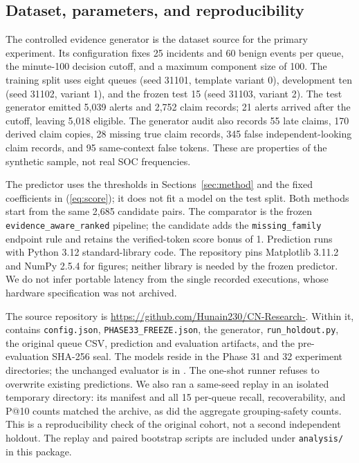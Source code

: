 \documentclass[pdflatex,sn-mathphys-num,iicol]{sn-jnl}
\begin{document}
\subsection{Dataset, parameters, and reproducibility}\label{sec:reproduce}
The controlled evidence generator is the dataset source for the primary experiment. Its configuration fixes 25 incidents and 60 benign events per queue, the minute-100 decision cutoff, and a maximum component size of 100. The training split uses eight queues (seed 31101, template variant 0), development ten (seed 31102, variant 1), and the frozen test 15 (seed 31103, variant 2). The test generator emitted 5,039 alerts and 2,752 claim records; 21 alerts arrived after the cutoff, leaving 5,018 eligible. The generator audit also records 55 late claims, 170 derived claim copies, 28 missing true claim records, 345 false independent-looking claim records, and 95 same-context false tokens. These are properties of the synthetic sample, not real SOC frequencies.

The predictor uses the thresholds in Sections~\ref{sec:method} and the fixed coefficients in (\ref{eq:score}); it does not fit a model on the test split. Both methods start from the same 2,685 candidate pairs. The comparator is the frozen \texttt{evidence\_aware\_ranked} pipeline; the candidate adds the \texttt{missing\_family} endpoint rule and retains the verified-token score bonus of 1. Prediction runs with Python 3.12 standard-library code. The repository pins Matplotlib 3.11.2 and NumPy 2.5.4 for figures; neither library is needed by the frozen predictor. We do not infer portable latency from the single recorded executions, whose hardware specification was not archived.

The source repository is \url{https://github.com/Hunain230/CN-Research-}. Within it,  contains \texttt{config.json}, \texttt{PHASE33\_FREEZE.json}, the generator, \texttt{run\_holdout.py}, the original queue CSV, prediction and evaluation artifacts, and the pre-evaluation SHA-256 seal. The models reside in the Phase 31 and 32 experiment directories; the unchanged evaluator is in . The one-shot runner refuses to overwrite existing predictions. We also ran a same-seed replay in an isolated temporary directory: its manifest and all 15 per-queue recall, recoverability, and P@10 counts matched the archive, as did the aggregate grouping-safety counts. This is a reproducibility check of the original cohort, not a second independent holdout. The replay and paired bootstrap scripts are included under \texttt{analysis/} in this package.
\end{document}

